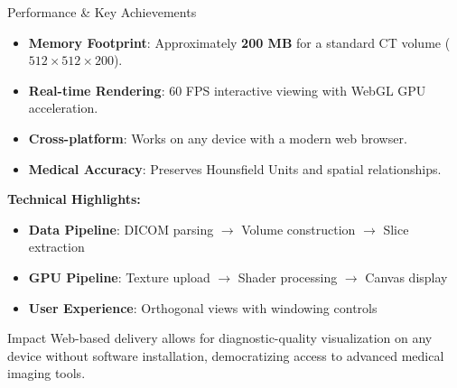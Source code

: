 \begin{frame}{Performance \& Key Achievements}
\begin{itemize}
    \item \textbf{Memory Footprint}: Approximately \textbf{200 MB} for a standard CT volume ($512 \times 512 \times 200$).
    \item \textbf{Real-time Rendering}: 60 FPS interactive viewing with WebGL GPU acceleration.
    \item \textbf{Cross-platform}: Works on any device with a modern web browser.
    \item \textbf{Medical Accuracy}: Preserves Hounsfield Units and spatial relationships.
\end{itemize}

\vspace{0.5cm}

\textbf{Technical Highlights:}
\begin{itemize}
  \item \textbf{Data Pipeline}: DICOM parsing $\rightarrow$ Volume construction $\rightarrow$ Slice extraction
  \item \textbf{GPU Pipeline}: Texture upload $\rightarrow$ Shader processing $\rightarrow$ Canvas display
  \item \textbf{User Experience}: Orthogonal views with windowing controls
\end{itemize}

\begin{block}{Impact}
Web-based delivery allows for diagnostic-quality visualization on any device without software installation, democratizing access to advanced medical imaging tools.
\end{block}
\end{frame}

